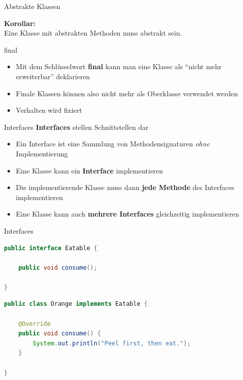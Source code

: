 \documentclass[18pt]{beamer}
\newcommand{\quotes}[1]{``#1''}
\begin{document}
\begin{frame}{Abstrakte Klassen}
    \begin{block}{}
        \textbf{Korollar:}\\
        Eine Klasse mit abstrakten Methoden muss abstrakt sein.
    \end{block}

\end{frame}

\begin{frame}{final}
    \begin{itemize}
        \item Mit dem Schlüsselwort \textbf{final} kann man eine Klasse als \quotes{nicht mehr erweiterbar} deklarieren
        \item Finale Klassen können also nicht mehr als Oberklasse verwendet werden
        \item Verhalten wird fixiert
    \end{itemize}
\end{frame}

\begin{frame}{Interfaces}
    \textbf{Interfaces} stellen Schnittstellen dar
    \begin{itemize}
        \item Ein Interface ist eine Sammlung von Methodensignaturen \textit{ohne} Implementierung
        \item Eine Klasse kann ein \textbf{Interface} implementieren
        \item Die implementierende Klasse muss dann \textbf{jede Methode} des Interfaces implementieren
        \item Eine Klasse kann auch \textbf{mehrere Interfaces} gleichzeitig implementieren
    \end{itemize}
\end{frame}

\begin{frame}[fragile]{Interfaces}
    \begin{exampleblock}{}
        \begin{lstlisting}[language=Java,basicstyle=\scriptsize]
public interface Eatable {

    public void consume();

}
        \end{lstlisting}

    \end{exampleblock}

    \begin{exampleblock}{}
        \begin{lstlisting}[language=Java,basicstyle=\scriptsize]
public class Orange implements Eatable {

    @Override
    public void consume() {
        System.out.println("Peel first, then eat.");
    }

}
        \end{lstlisting}

    \end{exampleblock}

\end{frame}
\end{document}
